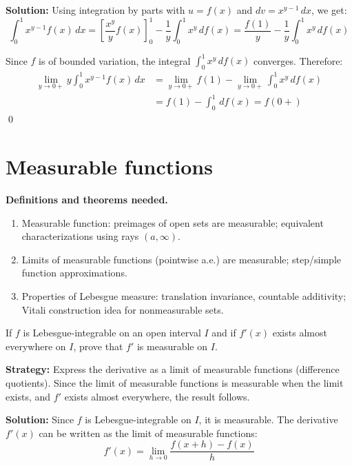 \bigskip\noindent\textbf{Solution:}
Using integration by parts with $u = f(x)$ and $dv = x^{y-1} \, dx$, we get:
\[\int_0^1 x^{y-1}f(x) \, dx = \left[\frac{x^y}{y} f(x)\right]_0^1 - \frac{1}{y} \int_0^1 x^y \, df(x) = \frac{f(1)}{y} - \frac{1}{y} \int_0^1 x^y \, df(x)\]

Since $f$ is of bounded variation, the integral $\int_0^1 x^y \, df(x)$ converges. Therefore:
\begin{align*}
\lim_{y \to 0+} y \int_0^1 x^{y-1}f(x) \, dx &= \lim_{y \to 0+} f(1) - \lim_{y \to 0+} \int_0^1 x^y \, df(x) \\
&= f(1) - \int_0^1 \, df(x) = f(0+)
\end{align*}\qed

\section{Measurable functions}

\noindent\textbf{Definitions and theorems needed.}
\begin{enumerate}[label=(\alph*)]
\item Measurable function: preimages of open sets are measurable; equivalent characterizations using rays $(a,\infty)$.
\item Limits of measurable functions (pointwise a.e.) are measurable; step/simple function approximations.
\item Properties of Lebesgue measure: translation invariance, countable additivity; Vitali construction idea for nonmeasurable sets.
\end{enumerate}



\begin{problembox}
\begin{problemstatement}
If $f$ is Lebesgue-integrable on an open interval $I$ and if $f'(x)$ exists almost everywhere on $I$, prove that $f'$ is measurable on $I$.
\end{problemstatement}
\end{problembox}

\noindent\textbf{Strategy:} Express the derivative as a limit of measurable functions (difference quotients). Since the limit of measurable functions is measurable when the limit exists, and $f'$ exists almost everywhere, the result follows.

\bigskip\noindent\textbf{Solution:}
Since $f$ is Lebesgue-integrable on $I$, it is measurable. The derivative $f'(x)$ can be written as the limit of measurable functions:
\[f'(x) = \lim_{h \to 0} \frac{f(x + h) - f(x)}{h}\]

